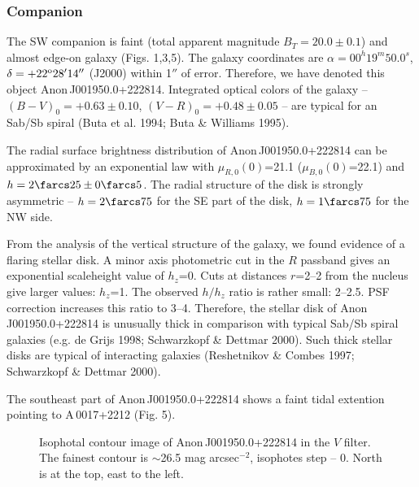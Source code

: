 \documentclass[]{aa}
\begin{document}
\subsubsection{Companion}

The SW companion is faint (total apparent magnitude
$B_T=20.0\pm0.1$) and almost edge-on galaxy (Figs. 1,3,5).
The galaxy coordinates are $\alpha=00^h19^m50.0^s$,
$\delta=+22^{\rm o}28'14''$ (J2000) within 1$''$ of error. 
Therefore, we have denoted this object Anon\,J001950.0+222814.
Integrated optical colors of the galaxy -- $(B-V)_0=+0.63\pm0.10$,
$(V-R)_0=+0.48\pm0.05$ -- are typical for an Sab/Sb spiral
(Buta et al. 1994; Buta \& Williams 1995).

The radial surface brightness distribution of Anon\,J001950.0+222814
can be approximated by an exponential law with $\mu_{R,0}(0)$=21.1
($\mu_{B,0}(0)$=22.1) and $h=2\farcs25\pm0\farcs5$. The radial
structure of the disk is strongly asymmetric -- $h=2\farcs75$ for
the SE part of the disk, $h=1\farcs75$ for the NW side. 

From the analysis of the vertical structure of the galaxy, we
found evidence of a flaring stellar disk. A minor axis photometric
cut in the $R$ passband gives an exponential scaleheight value of
$h_z$=0. Cuts at distances $r$=2--2 from the nucleus 
give larger values: $h_z$=1. The observed $h/h_z$ ratio
is rather small: 2--2.5. PSF correction increases this ratio
to 3--4. Therefore, the stellar disk of Anon\,J001950.0+222814 is 
unusually thick in comparison with typical Sab/Sb spiral galaxies 
(e.g. de Grijs 1998; Schwarzkopf \& Dettmar 2000). Such thick
stellar disks are typical of interacting galaxies (Reshetnikov \&
Combes 1997; Schwarzkopf \& Dettmar 2000).

The southeast part of Anon\,J001950.0+222814 shows a faint 
tidal extention pointing to A\,0017+2212 (Fig. 5). 

\begin{figure}
\centerline{}
\caption{Isophotal contour image of Anon\,J001950.0+222814
in the $V$ filter. The fainest contour is $\sim$26.5 mag arcsec$^{-2}$,
isophotes step -- 0. North is at the top, east to the left.}
\end{figure}
\end{document}
